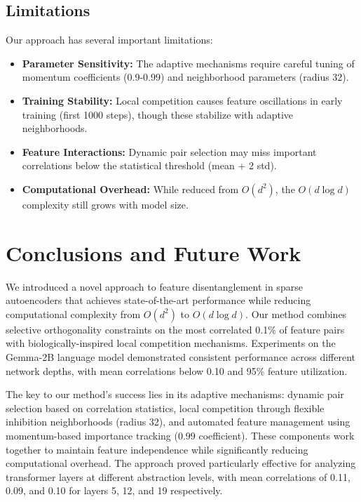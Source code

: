 \documentclass{article} %
\begin{document}
\subsection{Limitations}
Our approach has several important limitations:

\begin{itemize}
\item \textbf{Parameter Sensitivity:} The adaptive mechanisms require careful tuning of momentum coefficients (0.9-0.99) and neighborhood parameters (radius 32).

\item \textbf{Training Stability:} Local competition causes feature oscillations in early training (first 1000 steps), though these stabilize with adaptive neighborhoods.

\item \textbf{Feature Interactions:} Dynamic pair selection may miss important correlations below the statistical threshold (mean + 2 std).

\item \textbf{Computational Overhead:} While reduced from $O(d^2)$, the $O(d \log d)$ complexity still grows with model size.
\end{itemize}


\section{Conclusions and Future Work}
\label{sec:conclusion}

We introduced a novel approach to feature disentanglement in sparse autoencoders that achieves state-of-the-art performance while reducing computational complexity from $O(d^2)$ to $O(d \log d)$. Our method combines selective orthogonality constraints on the most correlated 0.1\% of feature pairs with biologically-inspired local competition mechanisms. Experiments on the Gemma-2B language model demonstrated consistent performance across different network depths, with mean correlations below 0.10 and 95\% feature utilization.

The key to our method's success lies in its adaptive mechanisms: dynamic pair selection based on correlation statistics, local competition through flexible inhibition neighborhoods (radius 32), and automated feature management using momentum-based importance tracking (0.99 coefficient). These components work together to maintain feature independence while significantly reducing computational overhead. The approach proved particularly effective for analyzing transformer layers at different abstraction levels, with mean correlations of 0.11, 0.09, and 0.10 for layers 5, 12, and 19 respectively.
\end{document}
